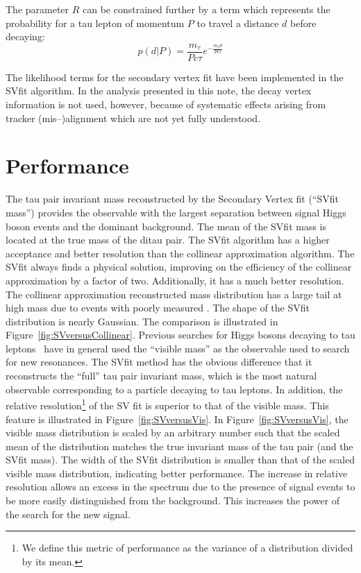 The parameter $R$ can be constrained further by a term which represents the
probability for a tau lepton of momentum $P$ to travel a distance $d$ before
decaying:
\begin{equation*}
p \left( d | P \right) = \frac{m_\tau}{P c\tau}e^{-\frac{m_\tau d}{P c\tau}}
\end{equation*}

The likelihood terms for the secondary vertex fit have been implemented in the
SVfit algorithm.  In the analysis presented in this note, the decay vertex
information is not used, however, because of systematic effects arising from
tracker (mis--)alignment which are not yet fully understood.

\section{Performance}

The tau pair invariant mass reconstructed by the Secondary Vertex fit (``SVfit
mass'') provides the observable with the largest separation between signal Higgs
boson events and the dominant \ZTT background.  The mean of the SVfit mass is
located at the true mass of the ditau pair.  The SVfit algorithm has a higher
acceptance and better resolution than the collinear approximation algorithm.
The SVfit always finds a physical solution, improving on the efficiency of the
collinear approximation by a factor of two.  Additionally, it has a much better
resolution.  The collinear approximation reconstructed mass distribution has a
large tail at high mass due to events with poorly measured \MET\@.  The shape of
the SVfit distribution is nearly Gaussian.  The comparison is illustrated in
Figure~\ref{fig:SVversusCollinear}.  Previous searches for Higgs bosons decaying
to tau leptons~\cite{CDFMSSMHiggs} have in general used the ``visible mass'' as
the observable used to search for new resonances.  The SVfit method has the
obvious difference that it reconstructs the ``full'' tau pair invariant mass,
which is the most natural observable corresponding to a particle decaying to tau
leptons.  In addition, the relative resolution\footnote{We define this metric of
performance as the variance of a distribution divided by its mean.} of the SV
fit is superior to that of the visible mass.  This feature is illustrated in
Figure~\ref{fig:SVversusVis}.  In Figure~\ref{fig:SVversusVis}, the visible mass
distribution is scaled by an arbitrary number such that the scaled mean of the
distribution matches the true invariant mass of the tau pair (and the SVfit
mass).  The width of the SVfit distribution is smaller than that of the scaled
visible mass distribution, indicating better performance.  The increase in
relative resolution allows an excess in the spectrum due to the presence of
signal events to be more easily distinguished from the \ZTT background.  This
increases the power of the search for the new signal.

